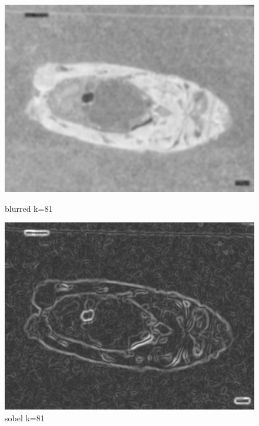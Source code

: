 \begin{figure}
    \centering
    \begin{minipage}{0.45\textwidth}
        \centering
        \includegraphics[width=\textwidth]{./fig/gausssian/blurred81.jpg}
        \caption{blurred k=81}
        \label{fig:blurred81}
    \end{minipage}
    \begin{minipage}{0.45\textwidth}
        \centering
        \includegraphics[width=\textwidth]{./fig/gausssian/sobel81.jpg}
        \caption{sobel k=81}
        \label{fig:sobel81}
    \end{minipage}
\end{figure}

